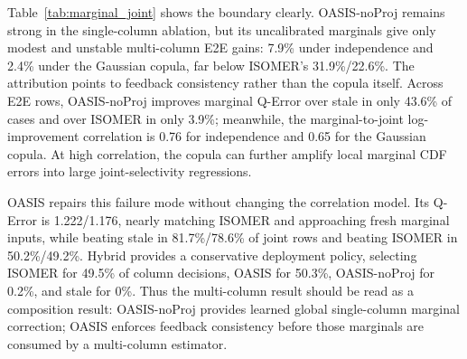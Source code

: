 \documentclass[runningheads]{llncs}
\begin{document}
\begin{table}[t]
  \centering
  \small
  \caption{Marginal-to-joint composition: average Q-Error ($\downarrow$) for two-column range predicates. Values average the configuration-level geometric means over 20 correlation/drift settings. OASIS is a feedback-consistency calibration layer on top of OASIS-noProj marginals; Hybrid uses only feedback-window residuals for selection.}
  \label{tab:marginal_joint}
  \setlength{\tabcolsep}{4pt}
\end{table}

Table~\ref{tab:marginal_joint} shows the boundary clearly. OASIS-noProj remains strong in the single-column ablation, but its uncalibrated marginals give only modest and unstable multi-column E2E gains: 7.9\% under independence and 2.4\% under the Gaussian copula, far below ISOMER's 31.9\%/22.6\%. The attribution points to feedback consistency rather than the copula itself. Across E2E rows, OASIS-noProj improves marginal Q-Error over stale in only 43.6\% of cases and over ISOMER in only 3.9\%; meanwhile, the marginal-to-joint log-improvement correlation is 0.76 for independence and 0.65 for the Gaussian copula. At high correlation, the copula can further amplify local marginal CDF errors into large joint-selectivity regressions.

OASIS repairs this failure mode without changing the correlation model. Its Q-Error is 1.222/1.176, nearly matching ISOMER and approaching fresh marginal inputs, while beating stale in 81.7\%/78.6\% of joint rows and beating ISOMER in 50.2\%/49.2\%. Hybrid provides a conservative deployment policy, selecting ISOMER for 49.5\% of column decisions, OASIS for 50.3\%, OASIS-noProj for 0.2\%, and stale for 0\%. Thus the multi-column result should be read as a composition result: OASIS-noProj provides learned global single-column marginal correction; OASIS enforces feedback consistency before those marginals are consumed by a multi-column estimator.
\end{document}
